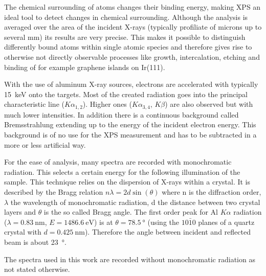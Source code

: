 The  chemical surrounding of atoms changes their binding energy, making XPS an ideal tool to detect changes in chemical surrounding. Although the analysis is averaged over the area of the incident X-rays (typically profiliate of microns up to several mm) its results are very precise. This makes it possible to distinguish differently bound atoms within single atomic species and therefore gives rise to otherwise not directly observable processes like growth, intercalation, etching and binding of for example graphene islands on Ir(111)\cite{busse_graphene_2011-1,granas_oxygen_2012}.

With the use of aluminum X-ray sources, electrons are accelerated with typically \SI{15}{\keV} onto the targets. Most of the created radiation goes into the principal characteristic line ($K\alpha_{1,2}$). Higher ones ($K\alpha_{3,4}$, $K\beta$) are also observed but with much lower intensities. In addition there is a continuous background called Bremsstrahlung extending up to the energy of the incident electron energy. This background is of no use for the XPS measurement and has to be subtracted in a more or less artificial way.

For the ease of analysis, many spectra are recorded with monochromatic radiation. This selects a certain energy for the following illumination of the sample. This technique relies on the dispersion of X-rays within a crystal. It is described by the Bragg relation $n\lambda = 2d\sin(\theta)$ where n is the diffraction order, $\lambda$ the wavelength of monochromatic radiation, d the distance between two crystal layers and $\theta$ is the so called Bragg angle. The first order peak for Al $K\alpha$ radiation ($\lambda=\SI{0,83}{\nm}$, $E=\SI{1486,6}{\eV}$) is at $\theta=\SI{78.5}{\degree}$ (using the $10\bar10$ planes of a quartz crystal with $d=\SI{0,425}{\nm}$). Therefore the angle between incident and reflected beam is about \SI{23}{\degree}.\cite{Riviere_90}

The spectra used in this work are recorded without monochromatic radiation as not stated otherwise.

